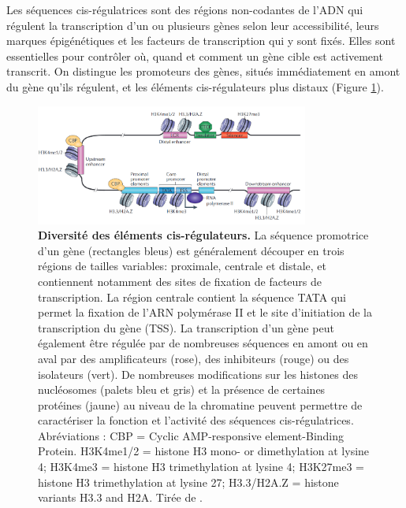 Les séquences \gls{cis}-régulatrices sont des régions non-codantes de l’ADN qui régulent la transcription d’un ou plusieurs gènes selon leur accessibilité, leurs marques épigénétiques et les facteurs de transcription qui y sont fixés. Elles sont essentielles pour contrôler où, quand et comment un gène cible est activement transcrit. On distingue les promoteurs des gènes, situés immédiatement en amont du gène qu’ils régulent, et les éléments \gls{cis}-régulateurs plus distaux (Figure \ref{fig:Fig5}).

\begin{figure}[h]
    \centering
    \includegraphics[width=0.8\textwidth, page=1] {figures/introduction/fig5.png}
    \caption[Diversité des éléments \gls{cis}-régulateurs.]{
    \textbf{Diversité des éléments \gls{cis}-régulateurs.}
    La séquence promotrice d'un gène (rectangles bleus) est généralement découper en trois régions de tailles variables: proximale, centrale et distale, et contiennent notamment des sites de fixation de facteurs de transcription. La région centrale contient la séquence TATA qui permet la fixation de l'\acrshort{ARN} polymérase II et le site d'initiation de la transcription du gène (\acrshort{TSS}). La transcription d'un gène peut également être régulée par de nombreuses séquences en amont ou en aval par des \glspl{amplificateur} (rose), des inhibiteurs (rouge) ou des isolateurs (vert). De nombreuses modifications sur les histones des nucléosomes (palets bleu et gris) et la présence de certaines protéines (jaune) au niveau de la chromatine peuvent permettre de caractériser la fonction et l'activité des séquences \gls{cis}-régulatrices.
    Abréviations : CBP = Cyclic AMP-responsive element-Binding Protein. H3K4me1/2 = histone H3 mono- or dimethylation at lysine 4; H3K4me3 = histone H3 trimethylation at lysine 4; H3K27me3 = histone H3 trimethylation at lysine 27; H3.3/H2A.Z = histone variants H3.3 and H2A. Tirée de \citep{ong_enhancer_2011}.\\
    }
    \label{fig:Fig5}
\end{figure} 


